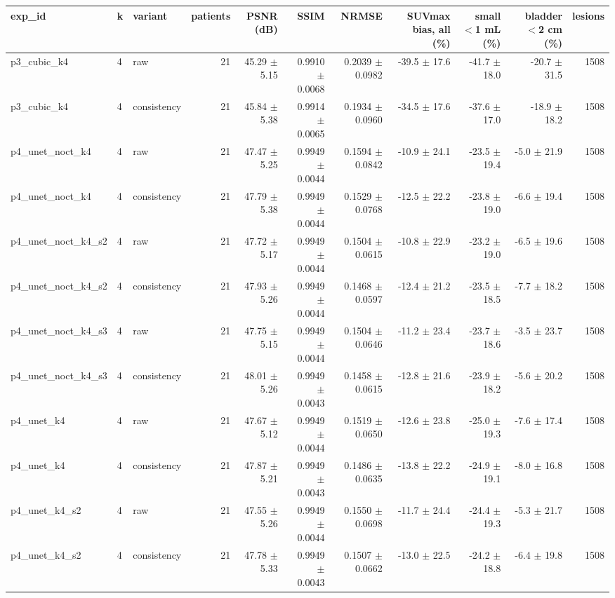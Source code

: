 \begin{tabular}{lllrrrrrrrr}
\toprule
exp\_id & k & variant & patients & PSNR (dB) & SSIM & NRMSE & SUVmax bias, all (\%) & small $<$1 mL (\%) & bladder $<$2 cm (\%) & lesions \\
\midrule
p3\_cubic\_k4 & 4 & raw & 21 & 45.29 $\pm$ 5.15 & 0.9910 $\pm$ 0.0068 & 0.2039 $\pm$ 0.0982 & -39.5 $\pm$ 17.6 & -41.7 $\pm$ 18.0 & -20.7 $\pm$ 31.5 & 1508 \\
p3\_cubic\_k4 & 4 & consistency & 21 & 45.84 $\pm$ 5.38 & 0.9914 $\pm$ 0.0065 & 0.1934 $\pm$ 0.0960 & -34.5 $\pm$ 17.6 & -37.6 $\pm$ 17.0 & -18.9 $\pm$ 18.2 & 1508 \\
p4\_unet\_noct\_k4 & 4 & raw & 21 & 47.47 $\pm$ 5.25 & 0.9949 $\pm$ 0.0044 & 0.1594 $\pm$ 0.0842 & -10.9 $\pm$ 24.1 & -23.5 $\pm$ 19.4 & -5.0 $\pm$ 21.9 & 1508 \\
p4\_unet\_noct\_k4 & 4 & consistency & 21 & 47.79 $\pm$ 5.38 & 0.9949 $\pm$ 0.0044 & 0.1529 $\pm$ 0.0768 & -12.5 $\pm$ 22.2 & -23.8 $\pm$ 19.0 & -6.6 $\pm$ 19.4 & 1508 \\
p4\_unet\_noct\_k4\_s2 & 4 & raw & 21 & 47.72 $\pm$ 5.17 & 0.9949 $\pm$ 0.0044 & 0.1504 $\pm$ 0.0615 & -10.8 $\pm$ 22.9 & -23.2 $\pm$ 19.0 & -6.5 $\pm$ 19.6 & 1508 \\
p4\_unet\_noct\_k4\_s2 & 4 & consistency & 21 & 47.93 $\pm$ 5.26 & 0.9949 $\pm$ 0.0044 & 0.1468 $\pm$ 0.0597 & -12.4 $\pm$ 21.2 & -23.5 $\pm$ 18.5 & -7.7 $\pm$ 18.2 & 1508 \\
p4\_unet\_noct\_k4\_s3 & 4 & raw & 21 & 47.75 $\pm$ 5.15 & 0.9949 $\pm$ 0.0044 & 0.1504 $\pm$ 0.0646 & -11.2 $\pm$ 23.4 & -23.7 $\pm$ 18.6 & -3.5 $\pm$ 23.7 & 1508 \\
p4\_unet\_noct\_k4\_s3 & 4 & consistency & 21 & 48.01 $\pm$ 5.26 & 0.9949 $\pm$ 0.0043 & 0.1458 $\pm$ 0.0615 & -12.8 $\pm$ 21.6 & -23.9 $\pm$ 18.2 & -5.6 $\pm$ 20.2 & 1508 \\
p4\_unet\_k4 & 4 & raw & 21 & 47.67 $\pm$ 5.12 & 0.9949 $\pm$ 0.0044 & 0.1519 $\pm$ 0.0650 & -12.6 $\pm$ 23.8 & -25.0 $\pm$ 19.3 & -7.6 $\pm$ 17.4 & 1508 \\
p4\_unet\_k4 & 4 & consistency & 21 & 47.87 $\pm$ 5.21 & 0.9949 $\pm$ 0.0043 & 0.1486 $\pm$ 0.0635 & -13.8 $\pm$ 22.2 & -24.9 $\pm$ 19.1 & -8.0 $\pm$ 16.8 & 1508 \\
p4\_unet\_k4\_s2 & 4 & raw & 21 & 47.55 $\pm$ 5.26 & 0.9949 $\pm$ 0.0044 & 0.1550 $\pm$ 0.0698 & -11.7 $\pm$ 24.4 & -24.4 $\pm$ 19.3 & -5.3 $\pm$ 21.7 & 1508 \\
p4\_unet\_k4\_s2 & 4 & consistency & 21 & 47.78 $\pm$ 5.33 & 0.9949 $\pm$ 0.0043 & 0.1507 $\pm$ 0.0662 & -13.0 $\pm$ 22.5 & -24.2 $\pm$ 18.8 & -6.4 $\pm$ 19.8 & 1508 \\

\end{tabular}
